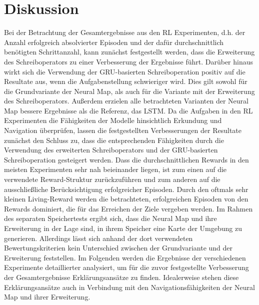 \chapter{Diskussion}
\label{chap_disc}

Bei der Betrachtung der Gesamtergebnisse aus den RL Experimenten, d.h. der Anzahl erfolgreich absolvierter Episoden und der dafür durchschnittlich benötigten Schrittanzahl, kann zunächst festgestellt werden, dass die Erweiterung des Schreiboperators zu einer Verbesserung der Ergebnisse führt. Darüber hinaus wirkt sich die Verwendung der GRU-basierten Schreiboperation positiv auf die Resultate aus, wenn die Aufgabenstellung schwieriger wird. Dies gilt sowohl für die Grundvariante der Neural Map, als auch für die Variante mit der Erweiterung des Schreiboperators. Außerdem erzielen alle betrachteten Varianten der Neural Map bessere Ergebnisse als die Referenz, das LSTM. Da die Aufgaben in den RL Experimenten die Fähigkeiten der Modelle hinsichtlich Erkundung und Navigation überprüfen, lassen die festgestellten Verbesserungen der Resultate zunächst den Schluss zu, dass die entsprechenden Fähigkeiten durch die Verwendung des erweiterten Schreiboperators und der GRU-basierten Schreiboperation gesteigert werden. Dass die durchschnittlichen Rewards in den meisten Experimenten sehr nah beieinander liegen, ist zum einen auf die verwendete Reward-Struktur zurückzuführen und zum anderen auf die ausschließliche Berücksichtigung erfolgreicher Episoden. Durch den oftmals sehr kleinen Living-Reward werden die betrachteten, erfolgreichen Episoden von den Rewards dominiert, die für das Erreichen der Ziele vergeben werden. Im Rahmen des separaten Speichertests ergibt sich, dass die Neural Map und ihre Erweiterung in der Lage sind, in ihrem Speicher eine Karte der Umgebung zu generieren. Allerdings lässt sich anhand der dort verwendeten Bewertungskriterien kein Unterschied zwischen der Grundvariante und der Erweiterung feststellen. Im Folgenden werden die Ergebnisse der verschiedenen Experimente detaillierter analysiert, um für die zuvor festgestellte Verbesserung der Gesamtergebnisse Erklärungsansätze zu finden. Idealerweise stehen diese Erklärungsansätze auch in Verbindung mit den Navigationsfähigkeiten der Neural Map und ihrer Erweiterung.

